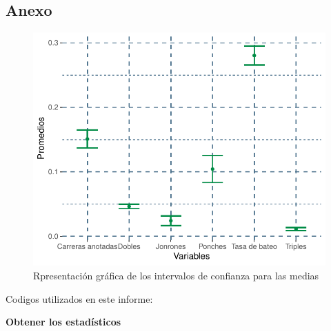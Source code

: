 \documentclass{staprojteamusb}
\begin{document}
 \hypertarget{anexo}{%
 \subsection{Anexo}\label{anexo}}
 \begin{figure}
 \centering
 \includegraphics{C03322-InformeFinal-Cordero-Gavazut-Riera_files/figure-latex/interconf-1.pdf}
 \caption{\label{fig:interconf}Rpresentación gráfica de los intervalos de confianza para las medias}
 \end{figure}

 Codigos utilizados en este informe:

 \textbf{Obtener los estadísticos}
\end{document}
